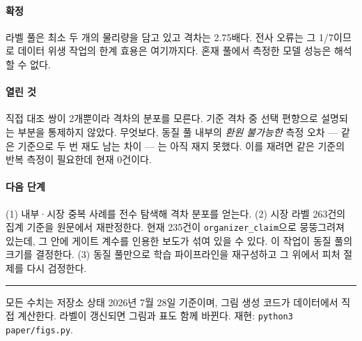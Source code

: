 \documentclass[10pt]{article}
\begin{document}
\paragraph{확정}
라벨 풀은 최소 두 개의 물리량을 담고 있고 격차는 2.75배다. 전사 오류는 그 1/7이므로
데이터 위생 작업의 한계 효용은 여기까지다. 혼재 풀에서 측정한 모델 성능은 해석할 수 없다.

\paragraph{열린 것}
직접 대조 쌍이 2개뿐이라 격차의 분포를 모른다. 기준 격차 중 선택 편향으로 설명되는 부분을
통제하지 않았다. 무엇보다, 동질 풀 내부의 \emph{환원 불가능한} 측정 오차 --- 같은 기준으로
두 번 재도 남는 차이 --- 는 아직 재지 못했다. 이를 재려면 같은 기준의 반복 측정이 필요한데
현재 0건이다.

\paragraph{다음 단계}
(1) 내부·시장 중복 사례를 전수 탐색해 격차 분포를 얻는다.
(2) 시장 라벨 263건의 집계 기준을 원문에서 재판정한다. 현재 235건이
\texttt{organizer\_claim}으로 뭉뚱그려져 있는데, 그 안에 게이트 계수를 인용한 보도가
섞여 있을 수 있다. 이 작업이 동질 풀의 크기를 결정한다.
(3) 동질 풀만으로 학습 파이프라인을 재구성하고 그 위에서 피처 절제를 다시 검정한다.

\vspace{0.7em}
\hrule
\vspace{0.4em}
{\footnotesize\color{black!60}
모든 수치는 저장소 상태 2026년 7월 28일 기준이며, 그림 생성 코드가 데이터에서 직접
계산한다. 라벨이 갱신되면 그림과 표도 함께 바뀐다. 재현: \texttt{python3 paper/figs.py}.}
\end{document}

